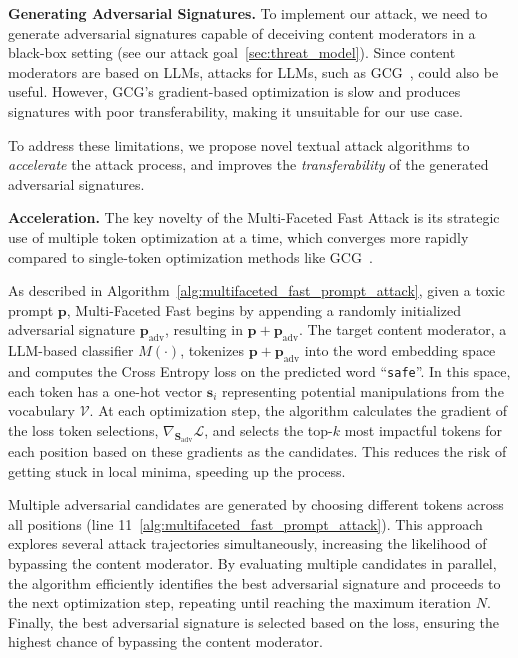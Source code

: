 \noindent \textbf{Generating Adversarial Signatures.} To implement our attack, we need to generate adversarial signatures capable of deceiving content moderators in a black-box setting (see our attack goal~\cref{sec:threat_model}). Since content moderators are based on LLMs, attacks for LLMs, such as GCG~\cite{gcg}, could also be useful. However, GCG's gradient-based optimization is slow and produces signatures with poor transferability, making it unsuitable for our use case.

To address these limitations, we propose novel textual attack algorithms to \textit{accelerate} the attack process, and improves the \textit{transferability} of the generated adversarial signatures. 


\noindent \textbf{Acceleration.} The key novelty of the Multi-Faceted Fast Attack is its strategic use of multiple token optimization at a time, which converges more rapidly compared to single-token optimization methods like GCG~\cite{gcg}.



As described in Algorithm~\ref{alg:multifaceted_fast_prompt_attack}, given a toxic prompt $\mathbf{p}$, Multi-Faceted Fast begins by appending a randomly initialized adversarial signature $\mathbf{p}_{\text{adv}}$, resulting in $\mathbf{p} + \mathbf{p}_{\text{adv}}$. The target content moderator, a LLM-based classifier $M(\cdot)$, tokenizes $\mathbf{p} + \mathbf{p}_{\text{adv}}$ into the word embedding space and computes the Cross Entropy loss on the predicted word ``\texttt{safe}''. In this space, each token has a one-hot vector $\mathbf{s}_i$ representing potential manipulations from the vocabulary $\mathcal{V}$. At each optimization step, the algorithm calculates the gradient of the loss \wrt token selections, $\nabla_{\mathbf{S}_{\text{adv}}} \mathcal{L}$, and selects the top-$k$ most impactful tokens for each position based on these gradients as the candidates. This reduces the risk of getting stuck in local minima, speeding up the process.

Multiple adversarial candidates are generated by choosing different tokens across all positions (line 11~\cref{alg:multifaceted_fast_prompt_attack}). This approach explores several attack trajectories simultaneously, increasing the likelihood of bypassing the content moderator. By evaluating multiple candidates  in parallel, the algorithm efficiently identifies the best adversarial signature and proceeds to the next optimization step, repeating until reaching the maximum iteration $N$. Finally,  the best adversarial signature is selected based on the loss, ensuring the highest chance of bypassing the content moderator.



